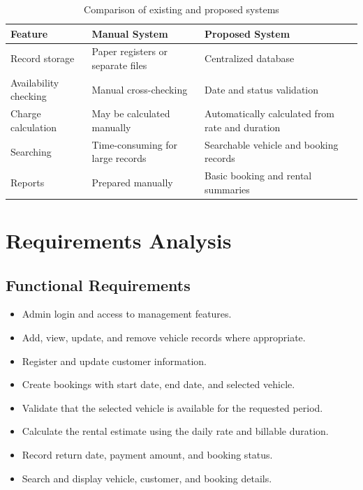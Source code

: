 \documentclass[11pt,a4paper]{report}
\begin{document}
\begin{longtable}{|p{3.5cm}|p{5cm}|p{5cm}|}
\caption{Comparison of existing and proposed systems}\\
\hline
\textbf{Feature} & \textbf{Manual System} & \textbf{Proposed System}\\ \hline
Record storage & Paper registers or separate files & Centralized database\\ \hline
Availability checking & Manual cross-checking & Date and status validation\\ \hline
Charge calculation & May be calculated manually & Automatically calculated from rate and duration\\ \hline
Searching & Time-consuming for large records & Searchable vehicle and booking records\\ \hline
Reports & Prepared manually & Basic booking and rental summaries\\ \hline
\end{longtable}

\section{Requirements Analysis}
\subsection{Functional Requirements}
\begin{itemize}
\item Admin login and access to management features.
\item Add, view, update, and remove vehicle records where appropriate.
\item Register and update customer information.
\item Create bookings with start date, end date, and selected vehicle.
\item Validate that the selected vehicle is available for the requested period.
\item Calculate the rental estimate using the daily rate and billable duration.
\item Record return date, payment amount, and booking status.
\item Search and display vehicle, customer, and booking details.
\end{itemize}
\end{document}
